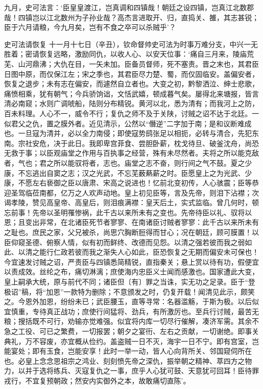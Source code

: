 \documentclass[]{article}
\begin{document}
九月，史可法言：`臣皇皇渡江，岂真调和四镇哉！朝廷之设四镇，岂真江北数郡哉！四镇岂以江北数州为子孙业哉？高杰言进取开、归，直捣关、雒，其志甚锐；臣于六月请粮，今九月矣，岂有不食之卒可以杀贼乎'？

史可法请恢复
十一月十七日（辛丑），钦命督帅史可法为时事万难分支，中兴一无胜着；密请恢复远略，激励同仇，以收人心、以安天位事：`痛自三月来，陵庙荒芜、山河鼎沸；大仇在目，一矢未加。臣备员督师，死不塞责。晋之末也，其君臣日图中原，而仅保江左；宋之季也，其君臣尽力楚、蜀，而仅固临安。盖偏安者，恢复之退步；未有志在偏安，而遽然自立者也。大变之初，黔黎洒泣、绅士悲歌，痛愤相乘，犹有朝气；今兵骄饷诎，文恬武嬉，顿成暮气矣。屡得北来塘报，皆言清必南窥；水则广调唬船，陆则分布精锐。黄河以北，悉为清有；而我河上之防，百未料理。人心不一，威令不行；复仇之师不及于关陕，讨贼之诏不达于北廷。一似君父之仇，置之膜外者。近见清示，公然以``僭逆''二字加于南；是和议断难成也。一旦寇为清并，必以全力南侵；即使寇势鸱张足以相扼，必转与清合，先犯东南。宗社安危，决于此日。我即卑宫菲食、尝胆卧薪，枕戈待旦、破釜沈舟，尚恐无救于事；以臣观庙堂之作用与百执事之经营，殊有未尽然者。夫将之所以能克敌者，气也；君之所以能驭将者，志也。庙堂之志不奋，则行间之气不鼓。夏之少康，不忘逃出自窦之志；汉之光武，不忘芜薮爇薪之时。臣愿皇上之为光武、少康，不愿左右亵御之臣以唐肃、宋高之说进也！忆前北变初传，人心骇震；臣等恭迎圣驾临莅南都，亿万之人欢声动地。皇上初见臣等，言及先帝，则泪下沾襟；次谒孝陵，赞见高皇帝、高皇后，则泪痕满襟：皇天后土，实式监临。曾几何时，顿忘前事！先帝以圣明罹惨祸，此千古以来所未有之变也。先帝待臣以礼、驭将以恩；且变出非常，在北诸臣死节者寥寥、在南诸臣讨贼者寥寥：此千古以来所未有之耻也。庶民之家，父兄被杀，尚思穴胸断脰得而甘心；况在朝廷，顾可膜置！以臣仰窥圣德、俯察人情，似有初而鲜终、改德而见怨。以清之强若彼而我之弱如此、以清之能行仁政若彼而我之渐失人心如此，臣恐恢复之无期而偏安未可保也！今宜速发讨贼之诏，严责臣与四镇悉简精锐，直指秦关；悬上赏以待有功，假便宜以责成效。丝纶之布，痛切淋漓；庶使海内忠臣义士闻而感激也。国家遭此大变，皇上嗣承大统，原与前代不同；诸臣但〔有〕罪之当诛，实无功之足录。臣于``登极诏''稿，将``加恩''一款特为删除；不意颁发之时，仍复开载！闻清见此示，颇笑之。今恩外加恩，纷纷未已；武臣腰玉，直等寻常：名器滥觞，于斯为极。以后似宜慎重，专待真正战功；庶使行间猛将、劲兵，有所激厉也。至兵行讨贼，最苦无粮；搜括既不可行，劝输亦觉难强。似宜将内库一切尽行催解，凑济军需。其余不急之工役、可已之繁费，一切报罢；朝夕之宴衎、左右之贡献，一切谢绝。即事关典礼，万不容废，亦宜概从俭约。盖盗贼一日不灭，海宇一日不宁。即有宫室，岂能宴处；即有玉食，岂能安享！此时一举一动，皆人心向背所关、邻国窥伺所在也。必皇上念念思祖宗之鸿业、刻刻愤先帝之深仇，振举朝之精神、萃四方之物力，以并于选将练兵、灭寇复仇之一事，庶乎人心犹可鼓、天意犹可回耳！臣待罪戎行，不宜复预朝政；然安内实御外之本，故敢痛切直陈'。
\end{document}
